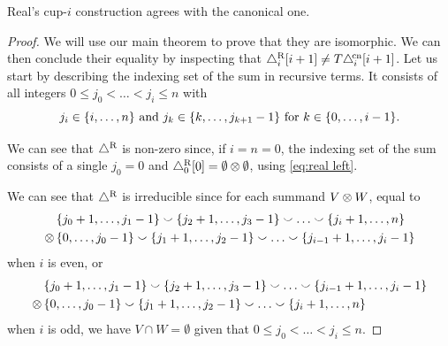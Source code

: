 \begin{theorem*}
	Real's \mbox{cup-$i$} construction agrees with the canonical one.
\end{theorem*}

\begin{proof}
	We will use our main theorem to prove that they are isomorphic.
	We can then conclude their equality by inspecting that $\triangle^{\mathrm{R}}_i [i+1] \neq T \triangle^{\!\mathrm{cn}}_i [i+1]$.
	Let us start by describing the indexing set of the sum in recursive terms.
	It consists of all integers $0 \leq j_0 < \dots < j_i \leq n$ with
	\begin{equation}\label{eq:indexing set recursively}
		j_i \in \{i,\dots,n\} \text{ and }
		j_k \in \{k,\dots,j_{k+1}-1\} \text{ for } k \in \{0,\dots,i-1\}.
	\end{equation}

	We can see that $\triangle^{\mathrm{R}}$ is non-zero since, if $i=n=0$, the indexing set of the sum consists of a single $j_0 = 0$ and $\triangle^{\mathrm{R}}_0 [0] = \emptyset \otimes \emptyset$, using \cref{eq:real left}.

	We can see that $\triangle^{\mathrm{R}}$ is irreducible since for each summand $V \otimes W$, equal to
	\begin{align*}
		&\{j_0+1,\dots,j_1-1\} \union \{j_2+1,\dots,j_3-1\} \union \dots \union \{j_i+1,\dots,n\} \\ \ot \,
		&\{0,\dots,j_0-1\} \union \{j_1+1,\dots,j_2-1\} \union \dots \union \{j_{i-1}+1,\dots,j_i-1\}
	\end{align*}
	when $i$ is even, or
	\begin{align*}
		&\{j_0+1,\dots,j_1-1\} \union \{j_2+1,\dots,j_3-1\} \union \dots \union \{j_{i-1}+1,\dots,j_i-1\} \\ \ot \,
		&\{0,\dots,j_0-1\} \union \{j_1+1,\dots,j_2-1\} \union \dots \union \{j_i+1,\dots,n\}
	\end{align*}
	when $i$ is odd, we have $V \cap W = \emptyset$ given that $0 \leq j_0 < \dots < j_i \leq n$.


\end{proof}
